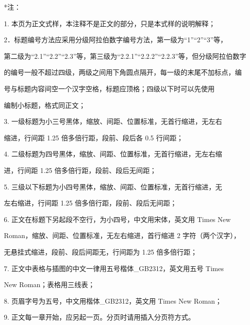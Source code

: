 \documentclass[a4paper,zihao=-4]{ctexart}
\newlength{\samplecontentwidth}
\begin{document}
\begin{minipage}[t]{\samplecontentwidth}
{\songti{}\noindent\mbox{*注：}\par}
\vspace{0.12cm}
{\songti{}
\noindent\hspace*{2em}1. 本页为正文式样，本注释不是正文的部分，只是本式样的说明解释；\par
\noindent\hspace*{2em}2．标题编号方法应采用分级阿拉伯数字编号方法，第一级为“1”“2”“3”等，\par
\noindent 第二级为“2.1”“2.2”“2.3”等，第三级为“2.2.1”“2.2.2”“2.2.3”等，但分级阿拉伯数字\par
\noindent 的编号一般不超过四级，两级之间用下角圆点隔开，每一级的末尾不加标点，编\par
\noindent 号与标题内容间空一个汉字空格，标题应顶格；四级以下时可以先使用\par
{}编制小标题，格式同正文；\par
\noindent\hspace*{2em}3. 一级标题为小三号黑体，缩放、间距、位置标准，无首行缩进，无左右\par
\noindent 缩进，行间距 1.25 倍多倍行距，段前、段后各 0.5 行间距；\par
\noindent\hspace*{2em}4. 二级标题为四号黑体，缩放、间距、位置标准，无首行缩进，无左右缩\par
\noindent 进，行间距 1.25 倍多倍行距，段前、段后无间距；\par
\noindent\hspace*{2em}5. 三级以下标题为小四号黑体，缩放、间距、位置标准，无首行缩进，无\par
\noindent 左右缩进，行间距 1.25 倍多倍行距，段前、段后无间距；\par
\noindent\hspace*{2em}6. 正文在标题下另起段不空行，为小四号，中文用宋体，英文用 Times New\par
\noindent Roman，缩放、间距、位置标准，无左右缩进，首行缩进 2 字符（两个汉字），\par
\noindent 无悬挂式缩进，段前、段后间距无，行间距为 1.25 倍多倍行距；\par
\noindent\hspace*{2em}7. 正文中表格与插图的中文一律用五号楷体\_GB2312，英文用五号 Times\par
\noindent New Roman；表格用三线表；\par
\noindent\hspace*{2em}8. 页眉字号为五号，中文用楷体\_GB2312，英文用 Times New Roman；\par
\noindent\hspace*{2em}9. 正文每一章开始，应另起一页。分页时请用插入分页符方式。\par
}
\end{minipage}
\end{document}
